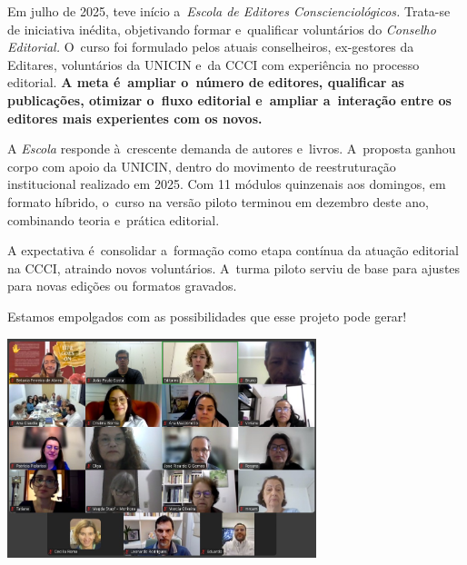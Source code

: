 \documentclass{gescons}
\begin{document}
    \begin{multicols}{2}


Em julho de 2025, teve início a~\emph{Escola de Editores Conscienciológicos.} Trata-se de iniciativa inédita, objetivando formar e~qualificar voluntários do \emph{Conselho Editorial.} O~curso foi formulado pelos atuais conselheiros, ex-gestores da Editares, voluntários da UNICIN e~da CCCI com experiência no processo editorial. \textbf{A meta é~ampliar o~número de editores, qualificar as publicações, otimizar o~fluxo editorial e~ampliar a~interação entre os editores mais experientes com os novos.}

A \emph{Escola} responde à~crescente demanda de autores e~livros. A~proposta ganhou corpo com apoio da UNICIN, dentro do movimento de reestruturação institucional realizado em 2025. Com 11 módulos quinzenais aos domingos, em formato híbrido, o~curso na versão piloto terminou em dezembro deste ano, combinando teoria e~prática editorial.

A expectativa é~consolidar a~formação como etapa contínua da atuação editorial na CCCI, atraindo novos voluntários. A~turma piloto serviu de base para ajustes para novas edições ou formatos gravados.

Estamos empolgados com as possibilidades que esse projeto pode gerar!


\begin{center}
    \includegraphics[width=9cm]{articles/atualizacoes/fotos/escola-editores/escola-editores1.jpeg} 
\end{center}


    \end{multicols}
\end{document}
